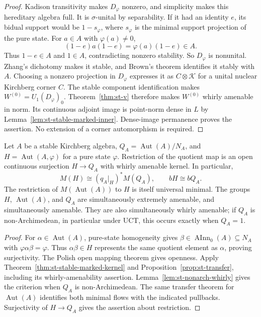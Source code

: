 \begin{proof}
Kadison transitivity makes \(D_\varphi\) nonzero, and simplicity
makes this hereditary algebra full. It is \(\sigma\)-unital by
separability. If it had an identity \(e\), its bidual support would be
\(1-s_\varphi\), where \(s_\varphi\) is the minimal support projection
of the pure state. For \(a\in A\) with \(\varphi(a)\ne0\),
\[
 (1-e)a(1-e)=\varphi(a)(1-e)\in A.
\]
Thus \(1-e\in A\) and \(1\in A\), contradicting nonzero stability.
So \(D_\varphi\) is nonunital. Zhang's dichotomy \cite[Theorem~1.2(i)]{Zhang1992} makes it stable, and
Brown's theorem \cite[Theorem~2.8]{Brown1977} identifies it stably with
\(A\). Choosing a
nonzero projection in \(D_\varphi\) expresses it as \(C\otimes\mathcal K\)
for a unital nuclear Kirchberg corner \(C\). The stable component
identification makes \(W^{(0)}=U_1(D_\varphi)_0\). Theorem~\ref{thm:st-v}
therefore makes \(W^{(0)}\) whirly amenable in norm. Its continuous
adjoint image is point-norm dense in \(L\) by
Lemma~\ref{lem:st-stable-marked-inner}. Dense-image permanence proves the
assertion. No extension of a corner automorphism is required.
\end{proof}

\begin{corollary}\label{cor:st-stable-stabilizer-umf}
 Let $A$ be a stable Kirchberg algebra, $Q_A=\operatorname{Aut}(A)/N_A$, and $H=\operatorname{Aut}(A,\varphi)$ for a pure state $\varphi$.
Restriction of the quotient map is an open continuous surjection $H\to Q_A$
with whirly amenable kernel. In particular,
\begin{equation*}
M(H)\cong(q_A|_H)^*M(Q_A),\qquad bH\cong bQ_A. 
\end{equation*}
The restriction of $M(\operatorname{Aut}(A))$ to $H$ is itself universal minimal. The
groups $H$, $\operatorname{Aut}(A)$, and $Q_A$ are simultaneously extremely amenable, and
simultaneously amenable.
They are also simultaneously whirly amenable; if $Q_A$ is
non-Archimedean, in particular under UCT, this occurs exactly when $Q_A=1$.
\end{corollary}

\begin{proof}
For $\alpha\in\operatorname{Aut}(A)$, pure-state homogeneity \cite[Theorem~2.1]{KishimotoOzawaSakai2003}
gives $\beta\in\operatorname{AInn}_0(A)\subseteq N_A$ with $\varphi\alpha\beta=\varphi$. Thus $\alpha\beta\in H$ represents
the same quotient element as $\alpha$, proving surjectivity. The Polish open
mapping theorem gives openness. Apply Theorem~\ref{thm:st-stable-marked-kernel}
and Proposition~\ref{prop:st-transfer}, including its whirly-amenability
assertion. Lemma~\ref{lem:st-nonarch-whirly} gives the criterion when $Q_A$
is non-Archimedean. The same transfer theorem for $\operatorname{Aut}(A)$
identifies both minimal flows with the indicated pullbacks. Surjectivity of $H\to Q_A$ gives the assertion about restriction.
\end{proof}

